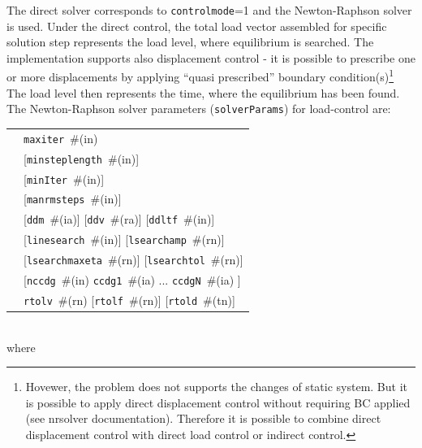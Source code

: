 \documentclass[a4paper]{article}
\makeatletter
\newcommand{\param}[1]{\texttt{#1}} %
\newcommand{\optional}[1]{[#1]} %
\newcommand{\field}[2]{\param{#1}~\#{\tiny(#2)}} %
\newcommand{\optField}[2]{\optional{\field{#1}{#2}}}
\newenvironment{record}[1][]{\begin{tabular}{|ll}}{\end{tabular}\\}
\newcommand{\recentry}[2]{{#1}&{#2}\\}
\newcounter{rcc}
\newenvironment{record}[1][\textwidth]{\setcounter{rcc}{0}\begin{tabular*}{#1}{|ll@{\extracolsep{\fill}}r}}{\end{tabular*}\\}
\newcommand{\recentry}[2]{\ifthenelse{\value{rcc}>0}{&$\backslash$ \\}{\setcounter{rcc}{1}}{#1}&{#2}}
\makeatother
\begin{document}
The direct solver corresponds to \param{controlmode}=1 and the Newton-Raphson solver is used.
Under the direct control, the total load
vector assembled for specific solution step represents the load level,
where equilibrium is searched. The implementation supports also
displacement control -  it is possible to prescribe one or more
displacements by applying ``quasi prescribed'' boundary
condition(s)\footnote{Hovewer, the problem does not supports the
changes of static system. But it is possible to apply direct
displacement control without requiring BC applied (see nrsolver
documentation). Therefore it is possible to combine
direct displacement control with direct load control or indirect
control.}
The load level then represents the
time, where the equilibrium has been found. The Newton-Raphson solver parameters (\param{solverParams}) for
load-control are:\\
\begin{record}
  \recentry{\hspace{10mm}}{\field{maxiter}{in}}
  \recentry{}{\optField{minsteplength}{in}}
  \recentry{}{\optField{minIter}{in}}
  \recentry{}{\optField{manrmsteps}{in}}
  \recentry{}{\optField{ddm}{ia} \optField{ddv}{ra} \optField{ddltf}{in}}
  \recentry{}{\optField{linesearch}{in} \optField{lsearchamp}{rn}}
  \recentry{}{\optField{lsearchmaxeta}{rn} \optField{lsearchtol}{rn}}
  \recentry{}{\optional{\field{nccdg}{in} \field{ccdg1}{ia} ... \field{ccdgN}{ia}  }}
  \recentry{}{\field{rtolv}{rn} \optField{rtolf}{rn} \optField{rtold}{tn}}
\end{record}
where
\end{document}
